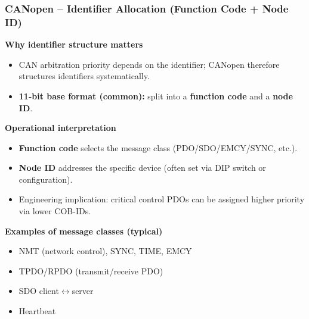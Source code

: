 \begin{frame}
	\frametitle{CANopen -- Identifier Allocation (Function Code + Node ID)}
	\small
	\textbf{Why identifier structure matters}
	\begin{itemize}
		\item CAN arbitration priority depends on the identifier; CANopen therefore structures identifiers systematically.
		\item \textbf{11-bit base format (common):} split into a \textbf{function code} and a \textbf{node ID}.
	\end{itemize}
	\vspace{0.4em}
	\textbf{Operational interpretation}
	\begin{itemize}
		\item \textbf{Function code} selects the message class (PDO/SDO/EMCY/SYNC, etc.).
		\item \textbf{Node ID} addresses the specific device (often set via DIP switch or configuration).
		\item Engineering implication: critical control PDOs can be assigned higher priority via lower COB-IDs.
	\end{itemize}
	\vspace{0.4em}
	\textbf{Examples of message classes (typical)}
	\begin{itemize}\footnotesize
		\item NMT (network control), SYNC, TIME, EMCY
		\item TPDO/RPDO (transmit/receive PDO)
		\item SDO client$\leftrightarrow$server
		\item Heartbeat
	\end{itemize}
  \end{frame}
